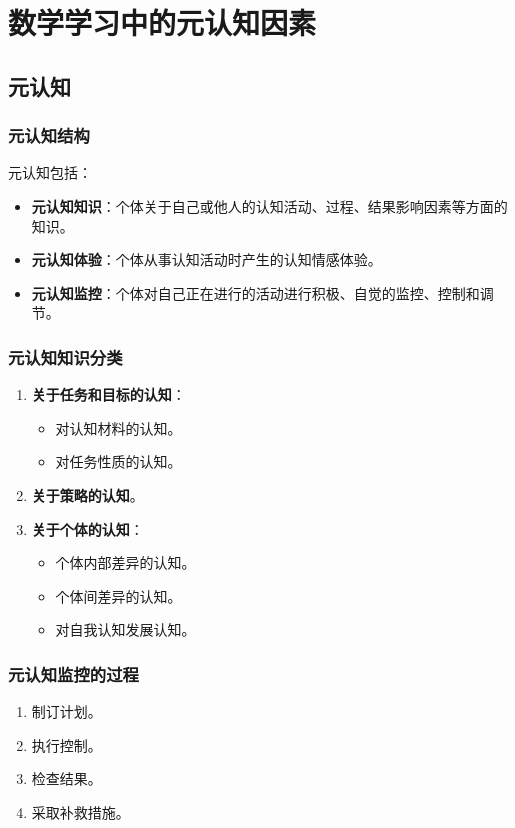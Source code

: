 \chapter{数学学习中的元认知因素}

\section{元认知}

\subsection*{元认知结构}
元认知包括：
\begin{itemize}
    \item \textbf{元认知知识}：个体关于自己或他人的认知活动、过程、结果影响因素等方面的知识。
    \item \textbf{元认知体验}：个体从事认知活动时产生的认知情感体验。
    \item \textbf{元认知监控}：个体对自己正在进行的活动进行积极、自觉的监控、控制和调节。
\end{itemize}

\begin{multicols}{2}

\subsection*{元认知知识分类}
\begin{enumerate}
    \item \textbf{关于任务和目标的认知}：
    \begin{itemize}
        \item 对认知材料的认知。
        \item 对任务性质的认知。
    \end{itemize}
    \item \textbf{关于策略的认知}。
    \item \textbf{关于个体的认知}：
    \begin{itemize}
        \item 个体内部差异的认知。
        \item 个体间差异的认知。
        \item 对自我认知发展认知。
    \end{itemize}
\end{enumerate}

\columnbreak

\subsection*{元认知监控的过程}
\begin{enumerate}
    \item 制订计划。
    \item 执行控制。
    \item 检查结果。
    \item 采取补救措施。
\end{enumerate}

\end{multicols}

